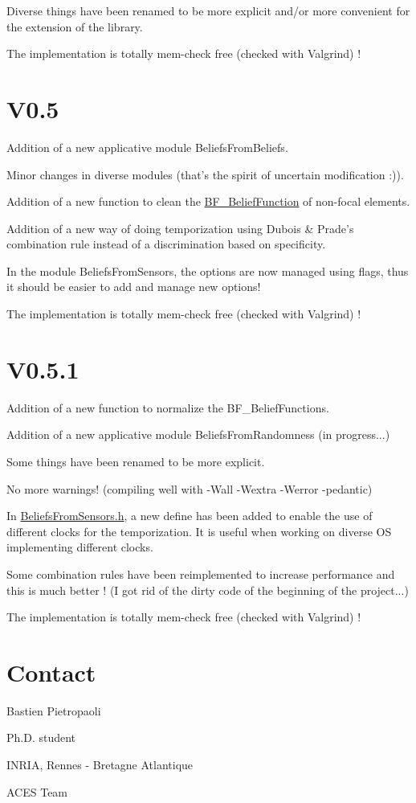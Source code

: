  Diverse things have been renamed to be more explicit and/or more convenient for the extension of the library. \par
 The implementation is totally mem-\/check free (checked with Valgrind) ! \par
\hypertarget{version_sec_v05_subsec}{}\section{V0.5}\label{version_sec_v05_subsec}
Addition of a new applicative module BeliefsFromBeliefs. \par
 Minor changes in diverse modules (that's the spirit of uncertain modification :)). \par
 Addition of a new function to clean the \hyperlink{struct_b_f___belief_function}{BF\_\-BeliefFunction} of non-\/focal elements. \par
 Addition of a new way of doing temporization using Dubois \& Prade's combination rule instead of a discrimination based on specificity. \par
 In the module BeliefsFromSensors, the options are now managed using flags, thus it should be easier to add and manage new options! \par
 The implementation is totally mem-\/check free (checked with Valgrind) ! \par
\hypertarget{version_sec_v051_subsec}{}\section{V0.5.1}\label{version_sec_v051_subsec}
Addition of a new function to normalize the BF\_\-BeliefFunctions. \par
 Addition of a new applicative module BeliefsFromRandomness (in progress...) \par
 Some things have been renamed to be more explicit. \par
 No more warnings! (compiling well with -\/Wall -\/Wextra -\/Werror -\/pedantic) \par
 In \hyperlink{_beliefs_from_sensors_8h}{BeliefsFromSensors.h}, a new define has been added to enable the use of different clocks for the temporization. It is useful when working on diverse OS implementing different clocks. \par
 Some combination rules have been reimplemented to increase performance and this is much better ! (I got rid of the dirty code of the beginning of the project...) \par
 The implementation is totally mem-\/check free (checked with Valgrind) ! \par
\hypertarget{version_sec_Version_contact}{}\section{Contact}\label{version_sec_Version_contact}
Bastien Pietropaoli \par
 Ph.D. student \par
 INRIA, Rennes -\/ Bretagne Atlantique \par
 ACES Team \par


